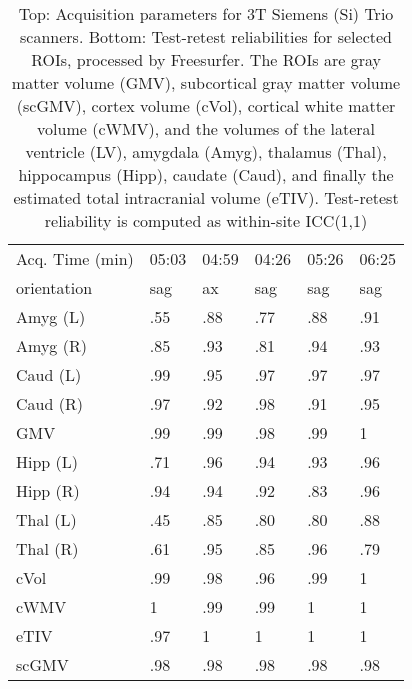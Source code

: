 \begin{table}
\begin{tabular}{llllll}
Acq. Time (min)       &           05:03 &           04:59 &           04:26 &           05:26 &           06:25 \\
orientation           &                sag &                 ax &                sag &                sag &                sag \\
Amyg (L)              &               .55 &               .88 &               .77 &               .88 &               .91 \\
Amyg (R)              &               .85 &               .93 &               .81 &               .94 &               .93 \\
Caud (L)              &               .99 &               .95 &               .97 &               .97 &               .97 \\
Caud (R)              &               .97 &               .92 &               .98 &               .91 &               .95 \\
GMV                   &               .99 &               .99 &               .98 &               .99 &               1   \\
Hipp (L)              &               .71 &               .96 &               .94 &               .93 &               .96 \\
Hipp (R)              &               .94 &               .94 &               .92 &               .83 &               .96 \\
Thal (L)              &               .45 &               .85 &               .80 &               .80 &               .88 \\
Thal (R)              &               .61 &               .95 &               .85 &               .96 &               .79 \\
cVol                  &               .99 &               .98 &               .96 &               .99 &               1   \\
cWMV                  &               1   &               .99 &               .99 &               1   &               1   \\
eTIV                  &               .97 &               1   &               1   &               1   &               1   \\
scGMV                 &               .98 &               .98 &               .98 &               .98 &               .98 \\
\bottomrule
\end{tabular}
\caption{Top: Acquisition parameters for 3T Siemens (Si) Trio scanners. Bottom: Test-retest reliabilities for selected ROIs, processed by Freesurfer. The ROIs are gray matter volume (GMV), subcortical gray matter volume (scGMV), cortex volume (cVol), cortical white matter volume (cWMV), and the volumes of the lateral ventricle (LV), amygdala (Amyg), thalamus (Thal), hippocampus (Hipp), caudate (Caud), and finally the estimated total intracranial volume (eTIV). Test-retest reliability is computed as within-site ICC(1,1)} 
\label{tab:acquisition4}

\end{table}